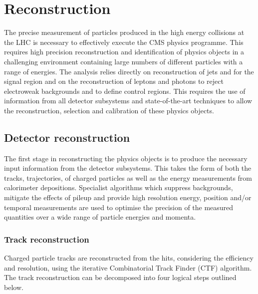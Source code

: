 \chapter{Reconstruction} %
\label{sec:reco}

The precise measurement of particles produced in the high energy collisions at the LHC 
is necessary to effectively execute the CMS physics programme. This requires high precision
reconstruction and identification of physics objects in a challenging environment containing
large numbers of different particles with a range of energies. The \alphat analysis 
relies directly on reconstruction of jets and \met for the signal region and on the 
reconstruction of leptons and photons to reject electroweak 
backgrounds and to define control regions.
This requires the use of information from all detector subsystems and state-of-the-art
techniques to allow the reconstruction, selection and calibration of these physics objects.


\section{Detector reconstruction}

The first stage in reconstructing the physics objects is to produce the necessary
input information from the detector subsystems. This takes the form of both the tracks, 
trajectories, of charged particles as well as the energy measurements from
calorimeter depositions. Specialist algorithms which suppress backgrounds, 
mitigate the effects of pileup and provide high resolution energy,
position and/or temporal measurements are used to optimise the precision of the 
measured quantities over a wide range of particle energies and momenta.

\subsection{Track reconstruction}

Charged particle tracks are reconstructed from the hits, considering the efficiency and resolution, 
using the iterative Combinatorial Track Finder (CTF) algorithm. The track reconstruction can be decomposed 
into four logical steps outlined below.

